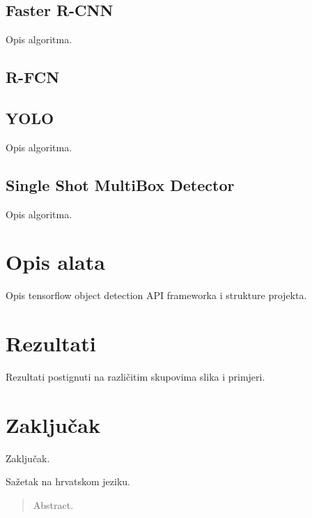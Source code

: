 \documentclass[times, utf8, diplomski]{fer}
\begin{document}
\section{Faster R-CNN}
Opis algoritma.

\section{R-FCN}

\section{YOLO}
Opis algoritma.

\section{Single Shot MultiBox Detector}
Opis algoritma.

\chapter{Opis alata}
Opis tensorflow object detection API frameworka i strukture projekta.

\chapter{Rezultati}
Rezultati postignuti na različitim skupovima slika i primjeri.



\chapter{Zaključak}
Zaključak.





\begin{sazetak}
Sažetak na hrvatskom jeziku.

\end{sazetak}

\begin{abstract}
Abstract.

\end{abstract}
\end{document}
